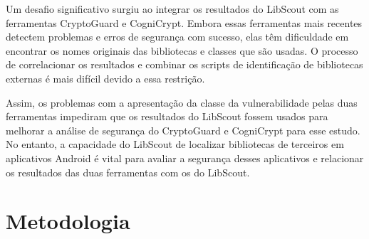 Um desafio significativo surgiu ao integrar os resultados do LibScout com as ferramentas CryptoGuard e CogniCrypt. Embora essas ferramentas mais recentes detectem problemas e erros de segurança com sucesso, elas têm dificuldade em encontrar os nomes originais das bibliotecas e classes que são usadas. O processo de correlacionar os resultados e combinar os scripts de identificação de bibliotecas externas é mais difícil devido a essa restrição.

Assim, os problemas com a apresentação da classe da vulnerabilidade pelas duas ferramentas impediram que os resultados do LibScout fossem usados para melhorar a análise de segurança do CryptoGuard e CogniCrypt para esse estudo. No entanto, a capacidade do LibScout de localizar bibliotecas de terceiros em aplicativos Android é vital para avaliar a segurança desses aplicativos e relacionar os resultados das duas ferramentas com os do LibScout.


\section{Metodologia}

